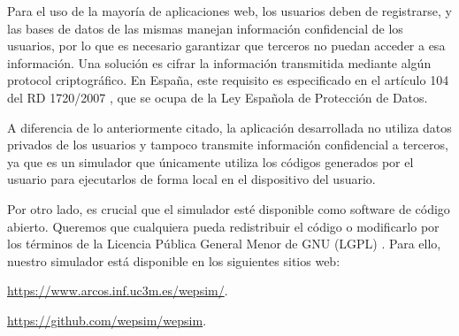 Para el uso de la mayoría de aplicaciones web, los usuarios deben de registrarse, y las bases de datos de las mismas manejan información confidencial de los usuarios, por lo que es necesario garantizar que terceros no puedan acceder a esa información. Una solución es cifrar la información transmitida mediante algún \gls{protocol} criptográfico. En España, este requisito es especificado en el artículo 104 del RD 1720/2007 \cite{boe2008}, que se ocupa de la Ley Española de Protección de Datos.


A diferencia de lo anteriormente citado, la aplicación desarrollada no utiliza datos privados de los usuarios y tampoco transmite información confidencial a terceros, ya que es un simulador que únicamente utiliza los códigos generados por el usuario para ejecutarlos de forma local en el dispositivo del usuario.


Por otro lado, es crucial que el simulador esté disponible como \gls{software} de código abierto. Queremos que cualquiera pueda redistribuir el código o modificarlo por los términos de la Licencia Pública General Menor de GNU (LGPL) \cite{gnulgpl}. Para ello, nuestro simulador está disponible en los siguientes sitios web: 

\url{https://www.arcos.inf.uc3m.es/wepsim/}.

\url{https://github.com/wepsim/wepsim}.

